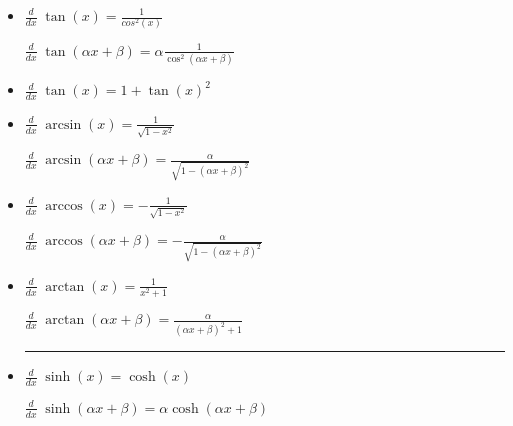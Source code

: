 \begin{itemize}[leftmargin=*]
	\item 
	\begin{minipage}{0.4\columnwidth}
		$\frac{d}{dx}\; \tan(x) = \frac{1}{cos^2(x)}$	
	\end{minipage}
	\begin{minipage}{0.55\columnwidth}
		$\frac{d}{dx}\; \tan(\alpha x + \beta) = \alpha \frac{1}{\cos^2(\alpha x + \beta)}$	
	\end{minipage}
	
	\item $\frac{d}{dx}\; \tan(x) = 1 + \tan(x)^2$

	\item 
	\begin{minipage}{0.4\columnwidth}
		$\frac{d}{dx}\; \arcsin(x) = \frac{1}{\sqrt{1-x^2}}$	
	\end{minipage}
	\begin{minipage}{0.55\columnwidth}
		$\frac{d}{dx}\; \arcsin(\alpha x + \beta) = \frac{\alpha}{\sqrt{1-(\alpha x + \beta)^2}}$
	\end{minipage}
		
	\item 
	\begin{minipage}{0.4\columnwidth}
		$\frac{d}{dx}\; \arccos(x) = -\frac{1}{\sqrt{1-x^2}}$ 
	\end{minipage}
	\begin{minipage}{0.55\columnwidth}
		$\frac{d}{dx}\; \arccos(\alpha x + \beta) = -\frac{\alpha}{\sqrt{1 - (\alpha x + \beta)^2}}$
	\end{minipage}
	
	\item 
	\begin{minipage}{0.4\columnwidth}
		$\frac{d}{dx}\; \arctan(x) = \frac{1}{x^2+1}$
	\end{minipage}
	\begin{minipage}{0.55\columnwidth}
		$\frac{d}{dx}\; \arctan(\alpha x + \beta) = \frac{\alpha}{(\alpha x + \beta)^2 + 1}$
	\end{minipage}
	\vspace{-0.2cm}
	\hrule
	\item 
	{\small
	\begin{minipage}{0.4\columnwidth}
		$\frac{d}{dx}\; \sinh(x) = \cosh(x)$
	\end{minipage}
	\begin{minipage}{0.55\columnwidth}
		$\frac{d}{dx}\; \sinh(\alpha x + \beta) = \alpha \cosh(\alpha x + \beta)$
	\end{minipage}}


\end{itemize}
